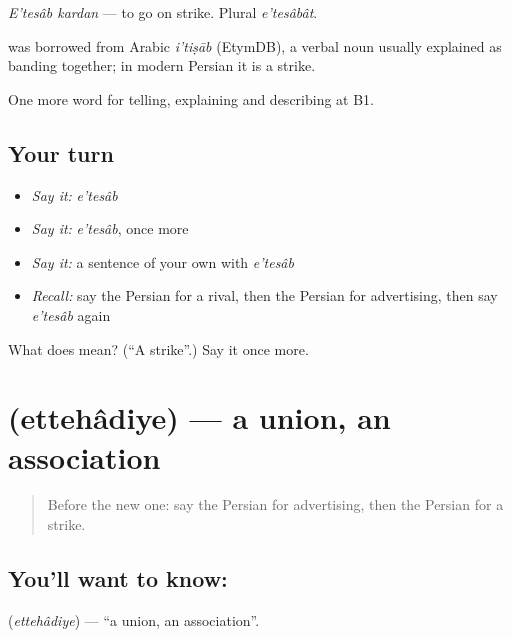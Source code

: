 \emph{E'tesâb kardan} — to go on strike. Plural \emph{e'tesâbât}.

\begin{cousinweb}
\textbf{} was borrowed from Arabic \emph{i'tiṣāb} (EtymDB), a verbal noun usually explained as banding together; in modern Persian it is a strike.
\end{cousinweb}

\begin{grammarlens}[title={What you've built}]
One more word for telling, explaining and describing at B1.
\end{grammarlens}

\subsection*{Your turn}
\begin{itemize}
\raggedright
  \item \emph{Say it:} \emph{e'tesâb}
  \item \emph{Say it:} \emph{e'tesâb}, once more
  \item \emph{Say it:} a sentence of your own with \emph{e'tesâb}
  \item \emph{Recall:} say the Persian for a rival, then the Persian for advertising, then say \emph{e'tesâb} again
\end{itemize}

\begin{tcolorbox}[breakable,colback=teal!4,colframe=teal!35!black,title={Before you move on}]
What does  mean? (\textquotedblleft{}A strike\textquotedblright{}.) Say it once more.
\end{tcolorbox}
\section[\texorpdfstring{\fa{اتحادیه} (ettehâdiye)}{اتحادیه (ettehâdiye)}]{ (ettehâdiye) — a union, an association}

\label{lesson:FA-C384-ettehadiye}



\begin{quote}
Before the new one: say the Persian for advertising, then the Persian for a strike.
\end{quote}

\subsection*{You'll want to know: }
\textbf{} (\emph{ettehâdiye}) — \textquotedblleft{}a union, an association\textquotedblright{}.

